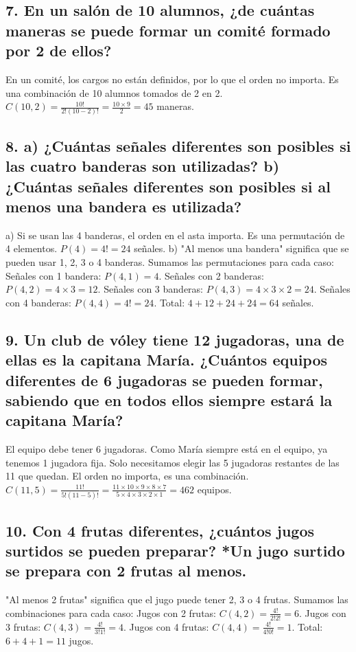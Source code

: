 \documentclass[11pt]{article}
\begin{document}
    \subsection*{7. En un salón de 10 alumnos, ¿de cuántas maneras se puede formar un comité formado por 2 de ellos?}
    En un comité, los cargos no están definidos, por lo que el orden no importa. Es una combinación de 10 alumnos tomados de 2 en 2.
    $C(10,2) = \frac{10!}{2!(10-2)!} = \frac{10 \times 9}{2} = 45$ maneras.

    \subsection*{8. a) ¿Cuántas señales diferentes son posibles si las cuatro banderas son utilizadas? b) ¿Cuántas señales diferentes son posibles si al menos una bandera es utilizada?}
    a) Si se usan las 4 banderas, el orden en el asta importa. Es una permutación de 4 elementos. $P(4) = 4! = 24$ señales.
    b) "Al menos una bandera" significa que se pueden usar 1, 2, 3 o 4 banderas. Sumamos las permutaciones para cada caso:
    Señales con 1 bandera: $P(4,1) = 4$.
    Señales con 2 banderas: $P(4,2) = 4 \times 3 = 12$.
    Señales con 3 banderas: $P(4,3) = 4 \times 3 \times 2 = 24$.
    Señales con 4 banderas: $P(4,4) = 4! = 24$.
    Total: $4 + 12 + 24 + 24 = 64$ señales.

    \subsection*{9. Un club de vóley tiene 12 jugadoras, una de ellas es la capitana María. ¿Cuántos equipos diferentes de 6 jugadoras se pueden formar, sabiendo que en todos ellos siempre estará la capitana María?}
    El equipo debe tener 6 jugadoras. Como María siempre está en el equipo, ya tenemos 1 jugadora fija. Solo necesitamos elegir las 5 jugadoras restantes de las 11 que quedan. El orden no importa, es una combinación.
    $C(11,5) = \frac{11!}{5!(11-5)!} = \frac{11 \times 10 \times 9 \times 8 \times 7}{5 \times 4 \times 3 \times 2 \times 1} = 462$ equipos.

    \subsection*{10. Con 4 frutas diferentes, ¿cuántos jugos surtidos se pueden preparar? *Un jugo surtido se prepara con 2 frutas al menos.}
    "Al menos 2 frutas" significa que el jugo puede tener 2, 3 o 4 frutas. Sumamos las combinaciones para cada caso:
    Jugos con 2 frutas: $C(4,2) = \frac{4!}{2!2!} = 6$.
    Jugos con 3 frutas: $C(4,3) = \frac{4!}{3!1!} = 4$.
    Jugos con 4 frutas: $C(4,4) = \frac{4!}{4!0!} = 1$.
    Total: $6 + 4 + 1 = 11$ jugos.
    
\end{document}
